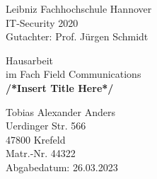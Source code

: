 Leibniz Fachhochschule Hannover\\
IT-Security 2020\\
Gutachter: Prof. Jürgen Schmidt\\

\vspace{5cm}
\begin{center}
    Hausarbeit\\
    im Fach Field Communications\\
    
    \vspace{3cm}
    \textbf{/*Insert Title Here*/}
\end{center}
\vfill

Tobias Alexander Anders\\
Uerdinger Str. 566\\
47800 Krefeld\\
Matr.-Nr. 44322\\

Abgabedatum: 26.03.2023
\thispagestyle{empty}    
\cleardoublepage